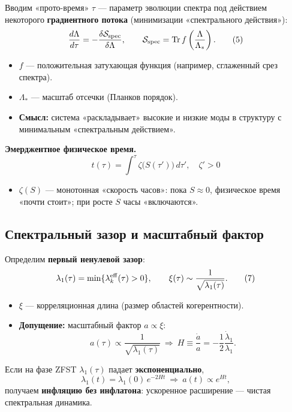 \documentclass[12pt,a4paper]{article}
\begin{document}
Вводим «прото-время» \(\tau\) — параметр эволюции спектра под действием некоторого \textbf{градиентного потока} (минимизации «спектрального действия»):
\[
\frac{d\Lambda}{d\tau} = -\frac{\delta \mathcal{S}_{\rm spec}}{\delta \Lambda}, \qquad
\mathcal{S}_{\rm spec} = \mathrm{Tr}\, f\left( \frac{\Lambda}{\Lambda_*} \right). \tag{5}
\]
\begin{itemize}
    \item \(f\) — положительная затухающая функция (например, сглаженный срез спектра).
    \item \(\Lambda_*\) — масштаб отсечки (Планков порядок).
    \item \textbf{Смысл:} система «раскладывает» высокие и низкие моды в структуру с минимальным «спектральным действием».
\end{itemize}

\textbf{Эмерджентное физическое время.}
\[
\boxed{t(\tau) = \int^{\tau} \zeta \big( S(\tau') \big) \, d\tau', \quad \zeta' > 0} \tag{6}
\]
\begin{itemize}
    \item \(\zeta(S)\) — монотонная «скорость часов»: пока \(S \approx 0\), физическое время «почти стоит»; при росте \(S\) часы «включаются».
\end{itemize}

\subsection{Спектральный зазор и масштабный фактор}
Определим \textbf{первый ненулевой зазор}:
\[
\lambda_1(\tau) = \min \{ \lambda_k^{\rm eff}(\tau) > 0 \}, \qquad
\xi(\tau) \sim \frac{1}{\sqrt{\lambda_1(\tau)}}. \tag{7}
\]
\begin{itemize}
    \item \(\xi\) — корреляционная длина (размер областей когерентности).
    \item \textbf{Допущение:} масштабный фактор \(a \propto \xi\):
    \[
    \boxed{a(\tau) \propto \frac{1}{\sqrt{\lambda_1(\tau)}}} \ \Rightarrow \
    H \equiv \frac{\dot{a}}{a} = -\frac{1}{2} \frac{\dot{\lambda}_1}{\lambda_1}. \tag{8}
    \]
\end{itemize}
Если на фазе ZFST \(\lambda_1(\tau)\) падает \textbf{экспоненциально},
\[
\lambda_1(t) = \lambda_1(0) \, e^{-2Ht} \ \Rightarrow \ a(t) \propto e^{Ht}, \tag{9}
\]
получаем \textbf{инфляцию без инфлатона}: ускоренное расширение — чистая спектральная динамика.
\end{document}
